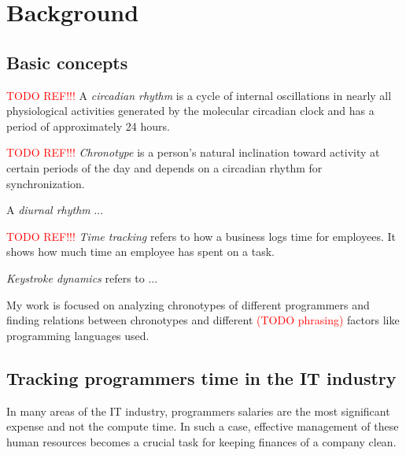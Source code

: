 \chapter{Background}\label{r:background}

\section{Basic concepts}

\begin{definition}\label{circadian_rhythm}
\textcolor{red}{TODO REF!!!}
A \emph{circadian rhythm} is a cycle of internal oscillations in
nearly all physiological activities generated by the molecular
circadian clock and has a period of approximately 24 hours.
\end{definition}


\begin{definition}
\textcolor{red}{TODO REF!!!}
\emph{Chronotype} is a person’s natural inclination toward
activity at certain periods of the day and depends on a circadian rhythm for synchronization.
\end{definition}

\begin{definition}
A \emph{diurnal rhythm} ...
\end{definition}

\begin{definition}
\textcolor{red}{TODO REF!!!}
\emph{Time tracking} refers to how a business logs time for employees. It shows how much time an employee has spent on a task.
\end{definition}

\begin{definition}
\emph{Keystroke dynamics} refers to ...
\end{definition}

My work is focused on analyzing chronotypes of different programmers and finding relations between chronotypes and different \textcolor{red}{(TODO phrasing)} factors like programming languages used.


\section{Tracking programmers time in the IT industry}

In many areas of the IT industry, programmers salaries are the most significant expense
and not the compute time. In such a case, effective management of these human resources
becomes a crucial task for keeping finances of a company clean.

